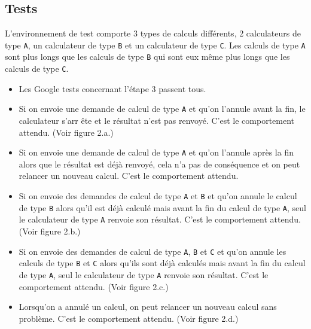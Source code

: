 \documentclass{article}
\begin{document}
\subsection{Tests}
L'environnement de test comporte 3 types de calculs différents, 2 calculateurs de type \texttt{A}, un
calculateur de type \texttt{B} et un calculateur de type \texttt{C}. Les calculs de type \texttt{A} sont plus longs
que les calculs de type \texttt{B} qui sont eux même plus longs que les calculs de type \texttt{C}.
\begin{itemize}
    \item Les Google tests concernant l'étape 3 passent tous.
    \item Si on envoie une demande de calcul de type \texttt{A} et qu'on l'annule avant la fin, le calculateur s'arr
    ête et le résultat n'est pas renvoyé. C'est le comportement attendu. (Voir figure 2.a.)
    \item Si on envoie une demande de calcul de type \texttt{A} et qu'on l'annule après la fin alors que le résultat
    est déjà renvoyé, cela n'a pas de conséquence et on peut relancer un nouveau calcul. C'est le comportement attendu.
    \item Si on envoie des demandes de calcul de type \texttt{A} et \texttt{B} et qu'on annule le calcul de type \texttt{B}
    alors qu'il est déjà calculé mais avant la fin du calcul de type \texttt{A}, seul le calculateur de type \texttt{A}
    renvoie son résultat. C'est le comportement attendu. (Voir figure 2.b.)
    \item Si on envoie des demandes de calcul de type \texttt{A}, \texttt{B} et \texttt{C} et qu'on annule les
    calculs de type \texttt{B} et \texttt{C} alors qu'ils sont déjà calculés mais avant la fin du calcul de type \texttt{A},
    seul le calculateur de type \texttt{A} renvoie son résultat. C'est le comportement attendu. (Voir figure 2.c.)
    \item Lorsqu'on a annulé un calcul, on peut relancer un nouveau calcul sans problème. C'est le comportement
    attendu. (Voir figure 2.d.)
\end{itemize}
\end{document}
